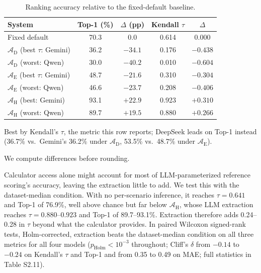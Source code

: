 \documentclass[final,3p,times]{elsarticle}
\begin{document}
\begin{table}[htbp]
\caption{Ranking accuracy relative to the fixed-default baseline.}
\label{tab:incremental-contribution}
\centering
\begin{threeparttable}
  \centering
  \footnotesize
  \begin{tabular}{lcccc}
    \toprule
    System & Top-1 (\%) & $\Delta$ (pp) & Kendall $\tau$ & $\Delta$ \\
    \midrule
    Fixed default & 70.3 & $0.0$ & 0.614 & $0.000$ \\
    $\mathcal{A}_{\text{D}}$ (best $\tau$: Gemini)\tnote{a} & 36.2 & $-34.1$ & 0.176 & $-0.438$ \\
    $\mathcal{A}_{\text{D}}$ (worst: Qwen)   & 30.0 & $-40.2$ & 0.010 & $-0.604$ \\
    \addlinespace
    $\mathcal{A}_{\text{E}}$ (best $\tau$: Gemini)\tnote{a} & 48.7 & $-21.6$ & 0.310 & $-0.304$ \\
    $\mathcal{A}_{\text{E}}$ (worst: Qwen)    & 46.6 & $-23.7$ & 0.208 & $-0.406$ \\
    \addlinespace
    $\mathcal{A}_{\text{H}}$ (best: Gemini) & 93.1 & $+22.9$ & 0.923 & $+0.310$ \\
    $\mathcal{A}_{\text{H}}$ (worst: Qwen)  & 89.7 & $+19.5$ & 0.880 & $+0.266$ \\
    \bottomrule
  \end{tabular}
  \begin{tablenotes}
  \footnotesize
  \item[a] Best by Kendall's $\tau$, the metric this row reports; DeepSeek leads on Top-1 instead (36.7\% vs.\ Gemini's 36.2\% under $\mathcal{A}_{\text{D}}$, 53.5\% vs.\ 48.7\% under $\mathcal{A}_{\text{E}}$).
  \item[] We compute differences before rounding.
  \end{tablenotes}
\end{threeparttable}
\end{table}
\FloatBarrier

Calculator access alone might account for most of LLM-parameterized reference scoring's accuracy, leaving the extraction little to add. We test this with the dataset-median condition. With no per-scenario inference, it reaches $\tau = 0.641$ and Top-1 of 76.9\%, well above chance but far below $\mathcal{A}_{\text{H}}$, whose LLM extraction reaches $\tau = 0.880$--$0.923$ and Top-1 of 89.7--93.1\%. Extraction therefore adds 0.24--0.28 in $\tau$ beyond what the calculator provides. In paired Wilcoxon signed-rank tests, Holm-corrected, extraction beats the dataset-median condition on all three metrics for all four models ($p_{\text{Holm}} < 10^{-3}$ throughout; Cliff's $\delta$ from $-0.14$ to $-0.24$ on Kendall's $\tau$ and Top-1 and from 0.35 to 0.49 on MAE; full statistics in Table S2.11).
\end{document}
